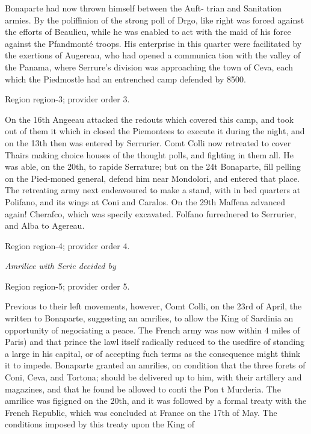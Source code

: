 \documentclass[11pt]{article}
\begin{document}
Bonaparte had now thrown himself between the Auft- trian and Sanitation armies. By the poliffinion of the
strong poll of Drgo, like right was forced against the efforts of Beaulieu, while he was enabled to act with the maid of his force against the Pfandmonté troops. His enterprise in this quarter were facilitated by the exertions of Augereau, who had opened a communica tion with the valley of the Panama, where Serrure's division was approaching the town of Ceva, each which the Piedmostle had an entrenched camp defended by 8500.
\par

{\scriptsize\color{gray} Region region-3; provider order 3.\par}
\medskip

On the 16th Angeeau attacked the redouts which covered this camp, and took out of them it which in closed the Piemontees to execute it during the night, and on the 13th then was entered by Serrurier. Comt Colli now retreated to cover Thairs making choice houses of the thought polls, and fighting in them all. He was able, on the 20th, to rapide Serrature; but on the 24t Bonaparte, fill pelling on the Pied-moned general, defend him near Mondolori, and entered that place. The retreating army next endeavoured to make a stand, with in bed quarters at Polifano, and its wings at Coni and Caralos. On the 29th Maffena advanced again! Cherafco, which was specily excavated. Folfano furrednered to Serrurier, and Alba to Agereau.
\par

{\scriptsize\color{gray} Region region-4; provider order 4.\par}
\medskip

{\small\itshape Amrilice with Serie decided by\par}

{\scriptsize\color{gray} Region region-5; provider order 5.\par}
\medskip

Previous to their left movements, however, Comt Colli, on the 23rd of April, the written to Bonaparte, suggesting an amrilies, to allow the King of Sardinia an opportunity of negociating a peace. The French army was now within 4 miles of Paris) and that prince the lawl itself radically reduced to the usedfire of standing a large in his capital, or of accepting fuch terms as the consequence might think it to impede. Bonaparte granted an amrilies, on condition that the three forets of Coni, Ceva, and Tortona; should be delivered up to him, with their artillery and magazines, and that he found be allowed to conti the Pon t Murderia. The amrilice was figigned on the 20th, and it was followed by a formal treaty with the French Republic, which was concluded at France on the 17th of May. The conditions imposed by this treaty upon the King of
\par
\end{document}

